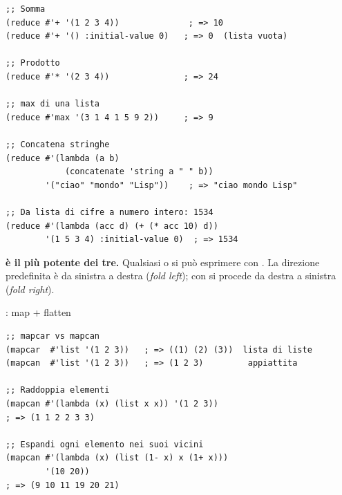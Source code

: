 \begin{esempio}[\fn{reduce}]
\begin{lstlisting}
;; Somma
(reduce #'+ '(1 2 3 4))              ; => 10
(reduce #'+ '() :initial-value 0)   ; => 0  (lista vuota)

;; Prodotto
(reduce #'* '(2 3 4))               ; => 24

;; max di una lista
(reduce #'max '(3 1 4 1 5 9 2))     ; => 9

;; Concatena stringhe
(reduce #'(lambda (a b)
            (concatenate 'string a " " b))
        '("ciao" "mondo" "Lisp"))    ; => "ciao mondo Lisp"

;; Da lista di cifre a numero intero: 1534
(reduce #'(lambda (acc d) (+ (* acc 10) d))
        '(1 5 3 4) :initial-value 0)  ; => 1534
\end{lstlisting}
\end{esempio}

\begin{intuizione}
\textbf{ è il più potente dei tre.}
Qualsiasi  o  si può esprimere con .
La direzione predefinita è da sinistra a destra (\emph{fold left});
con  si procede da destra a sinistra (\emph{fold right}).
\end{intuizione}

\seprule

\begin{concetto}{: map + flatten}

\boxsep
{}
\end{concetto}

\begin{esempio}[\fn{mapcan}]
\begin{lstlisting}
;; mapcar vs mapcan
(mapcar  #'list '(1 2 3))   ; => ((1) (2) (3))  lista di liste
(mapcan  #'list '(1 2 3))   ; => (1 2 3)         appiattita

;; Raddoppia elementi
(mapcan #'(lambda (x) (list x x)) '(1 2 3))
; => (1 1 2 2 3 3)

;; Espandi ogni elemento nei suoi vicini
(mapcan #'(lambda (x) (list (1- x) x (1+ x)))
        '(10 20))
; => (9 10 11 19 20 21)
\end{lstlisting}
\end{esempio}

